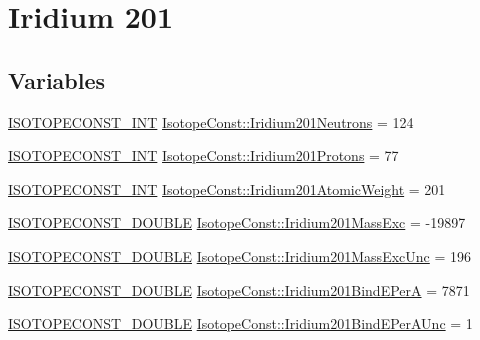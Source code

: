 \hypertarget{group___isotope_const-_iridium-_ir201}{}\section{Iridium 201}
\label{group___isotope_const-_iridium-_ir201}
\subsection*{Variables}
\begin{DoxyCompactItemize}
\item 
\mbox{\hyperlink{group___isotope_const-_macros_ga5f18360b3e99483a35c32d789e62621c}{I\+S\+O\+T\+O\+P\+E\+C\+O\+N\+S\+T\+\_\+\+I\+NT}} \mbox{\hyperlink{group___isotope_const-_iridium-_ir201_gab2da117dd2b9a5dacf95fcad4fe2991d}{Isotope\+Const\+::\+Iridium201\+Neutrons}} = 124
\item 
\mbox{\hyperlink{group___isotope_const-_macros_ga5f18360b3e99483a35c32d789e62621c}{I\+S\+O\+T\+O\+P\+E\+C\+O\+N\+S\+T\+\_\+\+I\+NT}} \mbox{\hyperlink{group___isotope_const-_iridium-_ir201_gab314005a736c5286b21f51cf2bbf3832}{Isotope\+Const\+::\+Iridium201\+Protons}} = 77
\item 
\mbox{\hyperlink{group___isotope_const-_macros_ga5f18360b3e99483a35c32d789e62621c}{I\+S\+O\+T\+O\+P\+E\+C\+O\+N\+S\+T\+\_\+\+I\+NT}} \mbox{\hyperlink{group___isotope_const-_iridium-_ir201_ga47236220acf78d3f723c334bb7ed9c9b}{Isotope\+Const\+::\+Iridium201\+Atomic\+Weight}} = 201
\item 
\mbox{\hyperlink{group___isotope_const-_macros_ga8f45a7272ce02c0b4c65c44636ed719a}{I\+S\+O\+T\+O\+P\+E\+C\+O\+N\+S\+T\+\_\+\+D\+O\+U\+B\+LE}} \mbox{\hyperlink{group___isotope_const-_iridium-_ir201_ga2f95c5faa43d530bd7a968d6a9738d9c}{Isotope\+Const\+::\+Iridium201\+Mass\+Exc}} = -\/19897
\item 
\mbox{\hyperlink{group___isotope_const-_macros_ga8f45a7272ce02c0b4c65c44636ed719a}{I\+S\+O\+T\+O\+P\+E\+C\+O\+N\+S\+T\+\_\+\+D\+O\+U\+B\+LE}} \mbox{\hyperlink{group___isotope_const-_iridium-_ir201_ga8fa67be2537c5d453c54260ada440600}{Isotope\+Const\+::\+Iridium201\+Mass\+Exc\+Unc}} = 196
\item 
\mbox{\hyperlink{group___isotope_const-_macros_ga8f45a7272ce02c0b4c65c44636ed719a}{I\+S\+O\+T\+O\+P\+E\+C\+O\+N\+S\+T\+\_\+\+D\+O\+U\+B\+LE}} \mbox{\hyperlink{group___isotope_const-_iridium-_ir201_ga43486fd2dc6a93e41e23c18fb99acfb1}{Isotope\+Const\+::\+Iridium201\+Bind\+E\+PerA}} = 7871
\item 
\mbox{\hyperlink{group___isotope_const-_macros_ga8f45a7272ce02c0b4c65c44636ed719a}{I\+S\+O\+T\+O\+P\+E\+C\+O\+N\+S\+T\+\_\+\+D\+O\+U\+B\+LE}} \mbox{\hyperlink{group___isotope_const-_iridium-_ir201_ga86de69da3081d0dfc56c41c5fce67c3b}{Isotope\+Const\+::\+Iridium201\+Bind\+E\+Per\+A\+Unc}} = 1

\end{DoxyCompactItemize}
